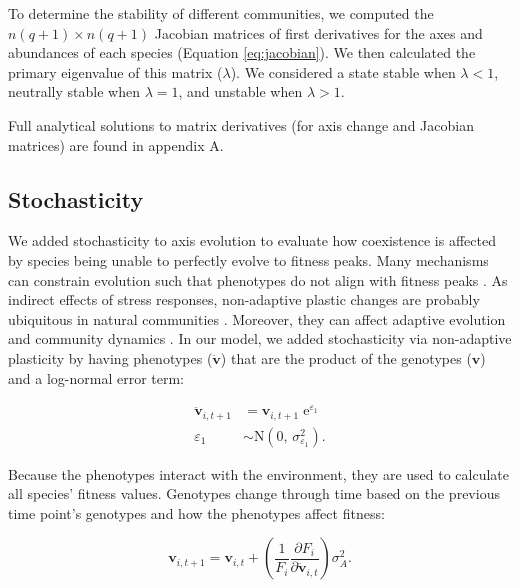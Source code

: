 To determine the stability of different communities, 
we computed the $n (q+1) \times n (q+1)$ Jacobian matrices
of first derivatives for the axes and abundances of each species (Equation \ref{eq:jacobian}).
We then calculated the primary eigenvalue of this matrix ($\lambda$).
We considered a state stable when $\lambda < 1$,
neutrally stable when $\lambda = 1$,
and unstable when $\lambda > 1$.

Full analytical solutions to matrix derivatives (for axis change and
Jacobian matrices) are found in appendix A.



\subsection*{Stochasticity}

We added stochasticity to axis evolution to evaluate how coexistence
is affected by species being unable to perfectly evolve to fitness peaks.
Many mechanisms can constrain evolution such that phenotypes do not 
align with fitness peaks
\citep[e.g., behavioral syndromes, pleiotropy, time lags;][]{Langerhans2002,Sih2004,Padilla1996}.
As indirect effects of stress responses, non-adaptive plastic
changes are probably ubiquitous in natural communities
\citep{Miner2005,Ghalambor2007}.
Moreover, they can affect adaptive evolution \citep{Ghalambor2015a}
and community dynamics \citep{Langerhans2002,Peacor2006}.
In our model, we added stochasticity via non-adaptive plasticity
by having phenotypes ($\mathbf{\ddot{v}}$) 
that are the product of the genotypes ($\mathbf{v}$) and a log-normal error term:


\begin{equation} \label{eq:V-stochasticity}
\begin{split}
    \mathbf{\ddot{v}}_{i,t+1} &= \mathbf{v}_{i,t+1} \; \text{e}^{\varepsilon_1} \\
    \varepsilon_1 &\sim \text{N}(0, \, \sigma^2_{\varepsilon_1})
    \text{.}
\end{split}
\end{equation}




Because the phenotypes interact with the environment, they are used
to calculate all species' fitness values.
Genotypes change through time based on the previous time point's 
genotypes and how the phenotypes affect fitness:

\begin{equation} \label{eq:axis-change-stochastic}
    \mathbf{v}_{i,t+1} = \mathbf{v}_{i,t} + \left( \frac{1}{F_i}
        \frac{\partial F_i}{\partial \mathbf{\ddot{v}}_{i,t}} \right) \sigma^2_A
    \textrm{.}
\end{equation}





